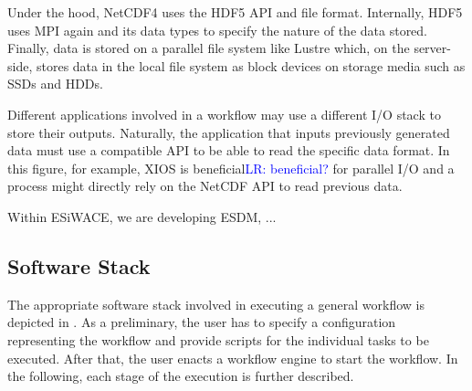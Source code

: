 \documentclass{superfri}
\newcommand{\jk}[1]{\todo[inline]{JK: #1}}
\newcommand{\lr}[1]{\textcolor{blue}{LR: #1}}
\begin{document}
Under the hood, NetCDF4 uses the HDF5 API and file format.
Internally, HDF5 uses MPI again and its data types to specify the nature of the data stored.
Finally, data is stored on a parallel file system like Lustre which, on the server-side, stores data in the local file system as block devices on storage media such as SSDs and HDDs.

Different applications involved in a workflow may use a different I/O stack to store their outputs.
Naturally, the application that inputs previously generated data must use a compatible API to be able to read the specific data format.
In this figure, for example, XIOS is beneficial\lr{beneficial?} for parallel I/O and a process might directly rely on the NetCDF API to read previous data.

Within ESiWACE, we are developing ESDM, ... \jk{TODO}

\subsection{Software Stack}

The appropriate software stack involved in executing a general workflow is depicted in .
As a preliminary, the user has to specify a configuration representing the workflow and provide scripts for the individual tasks to be executed. After that, the user enacts a workflow engine to start the workflow.
In the following, each stage of the execution is further described.

\end{document}
